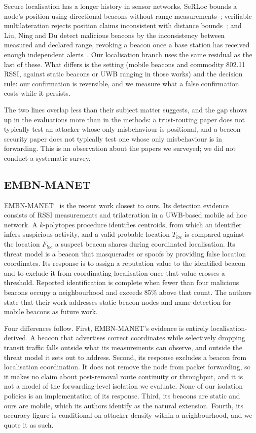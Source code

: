 Secure localisation has a longer history in sensor networks. SeRLoc bounds a
node's position using directional beacons without range
measurements~\cite{lazos2004serloc}; verifiable multilateration rejects
position claims inconsistent with distance bounds~\cite{capkun2006secure};
and Liu, Ning and Du detect malicious beacons by the inconsistency between
measured and declared range, revoking a beacon once a base station has
received enough independent alerts~\cite{liu2005detecting}. Our localisation
branch uses the same residual as the last of these. What differs is the
setting (mobile beacons and commodity 802.11 RSSI, against static beacons
or UWB ranging in those works) and the decision rule: our confirmation is
reversible, and we measure what a false confirmation costs while it
persists.

The two lines overlap less than their subject matter suggests, and the gap
shows up in the evaluations more than in the methods: a trust-routing
paper does not typically test an attacker whose only misbehaviour is
positional, and a beacon-security paper does not typically test one whose
only misbehaviour is in forwarding. This is an observation about the papers
we surveyed; we did not conduct a systematic survey.

\subsection{EMBN-MANET}

EMBN-MANET~\cite{kuriakose2023embn} is the recent work closest to ours. Its
detection evidence consists of RSSI measurements and trilateration in a
UWB-based mobile ad hoc network. A $k$-polytopes procedure identifies
centroids, from which an identifier infers suspicious activity, and a valid
probable location $T_{loc}$ is compared against the location $F_{loc}$ a
suspect beacon shares during coordinated localisation. Its threat model is a
beacon that masquerades or spoofs by providing false location coordinates.
Its response is to assign a reputation value to the identified beacon and to
exclude it from coordinating localisation once that value crosses a
threshold. Reported identification is complete when fewer than four
malicious beacons occupy a neighbourhood and exceeds 85\% above that count.
The authors state that their work addresses static beacon nodes and name
detection for mobile beacons as future work.

Four differences follow. First, EMBN-MANET's evidence is entirely
localisation-derived. A beacon that advertises correct coordinates while
selectively dropping transit traffic falls outside what its measurements can
observe, and outside the threat model it sets out to address. Second, its
response excludes a beacon from localisation coordination. It does not
remove the node from packet forwarding, so it makes no claim about
post-removal route continuity or throughput, and it is not a model of the
forwarding-level isolation we evaluate. None of our isolation policies is an
implementation of its response. Third, its beacons are static and ours are
mobile, which its authors identify as the natural extension. Fourth, its
accuracy figure is conditional on attacker density within a neighbourhood,
and we quote it as such.

